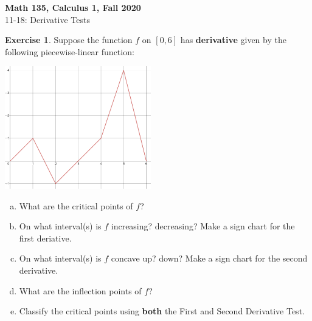 \documentclass[11pt,reqno,final]{amsart}
\numberwithin{figure}{section}
\theoremstyle{definition} %
\newtheorem{exercise}[question]{Exercise}
\begin{document}
\begin{center}
        \textbf{\Large Math 135, Calculus 1, Fall 2020}\\[10pt]
        {\large 11-18: Derivative Tests}
\end{center}

\thispagestyle{empty}


\renewcommand{\thesection}{\Alph{section}}




\begin{exercise}
        Suppose the function $f$ on $[0,6]$ has \textbf{derivative} given by the following piecewise-linear function:
        \begin{center}
                \includegraphics[width=2.5in]{11-18P_g1.png}
        \end{center}
        \begin{enumerate}[(a)]
        \item What are the critical points of $f$?
                \vfill
        \item On what interval(s) is $f$ increasing? decreasing? Make a sign chart for the first deriative.
                \vfill
        \item On what interval(s) is $f$ concave up? down? Make a sign chart for the second derivative.
                \vfill
        \item What are the inflection points of $f$?
                \vfill
        \item Classify the critical points using \textbf{both} the First and Second Derivative Test.
                \vfill
        \end{enumerate}
\end{exercise}
\end{document}
